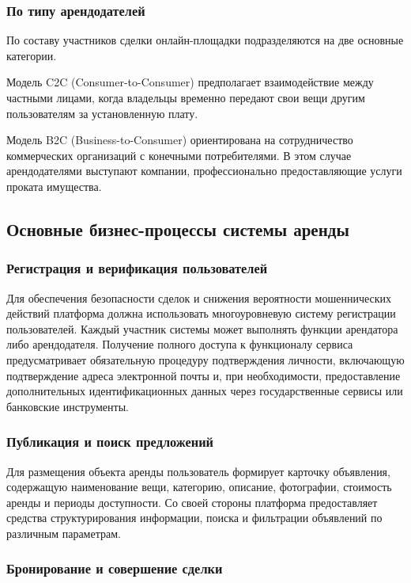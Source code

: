 \subsubsection{По типу арендодателей}

По составу участников сделки онлайн-площадки подразделяются на две основные категории.

Модель C2C (Consumer-to-Consumer) предполагает взаимодействие между частными лицами, когда владельцы временно передают свои вещи другим пользователям за установленную плату.

Модель B2C (Business-to-Consumer) ориентирована на сотрудничество коммерческих организаций с конечными потребителями. В этом случае арендодателями выступают компании, профессионально предоставляющие услуги проката имущества.

\subsection{Основные бизнес-процессы системы аренды}

\subsubsection{Регистрация и верификация пользователей}

Для обеспечения безопасности сделок и снижения вероятности мошеннических действий платформа должна использовать многоуровневую систему регистрации пользователей. Каждый участник системы может выполнять функции арендатора либо арендодателя. Получение полного доступа к функционалу сервиса предусматривает обязательную процедуру подтверждения личности, включающую подтверждение адреса электронной почты и, при необходимости, предоставление дополнительных идентификационных данных через государственные сервисы или банковские инструменты.

\subsubsection{Публикация и поиск предложений}

Для размещения объекта аренды пользователь формирует карточку объявления, содержащую наименование вещи, категорию, описание, фотографии, стоимость аренды и периоды доступности. Со своей стороны платформа предоставляет средства структурирования информации, поиска и фильтрации объявлений по различным параметрам.

\subsubsection{Бронирование и совершение сделки}

